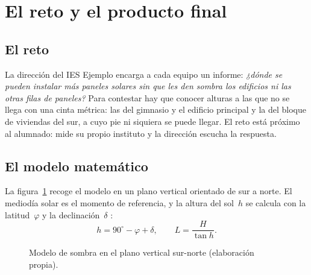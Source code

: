 \section{El reto y el producto final}

\subsection{El reto}
La dirección del IES Ejemplo encarga a cada equipo un informe: \emph{¿dónde se pueden instalar más paneles solares sin que les den sombra los edificios ni las otras filas de paneles?} Para contestar hay que conocer alturas a las que no se llega con una cinta métrica: las del gimnasio y el edificio principal y la del bloque de viviendas del sur, a cuyo pie ni siquiera se puede llegar. El reto está próximo al alumnado: mide su propio instituto y la dirección escucha la respuesta.

\subsection{El modelo matemático}
La figura~\ref{fig:sombra} recoge el modelo en un plano vertical orientado de sur a norte. El mediodía solar es el momento de referencia, y la altura del sol~$h$ se calcula con la latitud~$\varphi$ y la declinación~$\delta$ \parencite{pveducation}:
\[
  h = 90^\circ - \varphi + \delta, \qquad L = \frac{H}{\tan h}.
\]

\begin{figure}[h]
\centering
{}
\caption{Modelo de sombra en el plano vertical sur-norte (elaboración propia).}\label{fig:sombra}
\end{figure}

